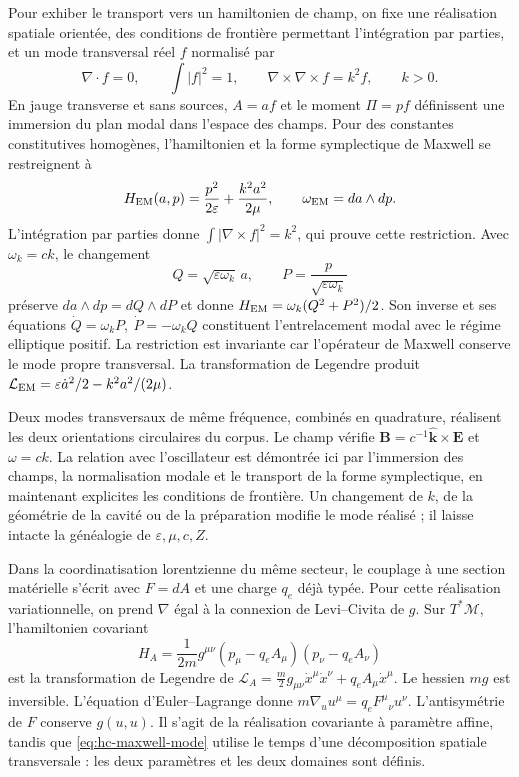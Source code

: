 Pour exhiber le transport vers un hamiltonien de champ, on fixe une
réalisation spatiale orientée, des conditions de frontière permettant
l’intégration par parties, et un mode transversal réel \(f\) normalisé par
\[
 \nabla\cdot f=0,\qquad \int|f|^2=1,\qquad
 \nabla\times\nabla\times f=k^2f,\qquad k>0.
\]
En jauge transverse et sans sources, \(A=af\) et le moment \(\Pi=pf\) définissent une immersion du plan modal dans l'espace des champs. Pour des constantes constitutives homogènes, l'hamiltonien et la forme symplectique de Maxwell se restreignent à
\begin{equation}
 H_{\rm EM}(a,p)=\frac{p^2}{2\varepsilon}
 +\frac{k^2a^2}{2\mu},\qquad \omega_{\rm EM}=da\wedge dp.
 \label{eq:hc-maxwell-mode}
\end{equation}
L’intégration par parties donne
\(\int|\nabla\times f|^2=k^2\), qui prouve cette restriction.
Avec \(\omega_k=ck\), le changement
\begin{equation}
 Q=\sqrt{\varepsilon\omega_k}\,a,
 \qquad P=\frac{p}{\sqrt{\varepsilon\omega_k}}
 \label{eq:hc-maxwell-symplectic}
\end{equation}
préserve \(da\wedge dp=dQ\wedge dP\) et donne
\(H_{\rm EM}=\omega_k(Q^2+P^2)/2\). Son inverse et ses équations
\(\dot Q=\omega_kP,\ \dot P=-\omega_kQ\)
constituent l’entrelacement modal avec le régime elliptique positif.
La restriction est invariante car l’opérateur de Maxwell conserve le
mode propre transversal. La transformation de Legendre produit
\(\mathcal L_{\rm EM}=\varepsilon\dot a^2/2-k^2a^2/(2\mu)\).

Deux modes transversaux de même fréquence, combinés en quadrature,
réalisent les deux orientations circulaires du corpus. Le champ vérifie
\(\mathbf B=c^{-1}\widehat{\mathbf k}\times\mathbf E\) et
\(\omega=ck\). La relation avec l’oscillateur est démontrée ici par
l’immersion des champs, la normalisation modale et le transport de la forme
symplectique, en maintenant explicites les conditions de frontière.
Un changement de \(k\), de la géométrie de la cavité ou de la préparation
modifie le mode réalisé ; il laisse intacte la généalogie de
\(\varepsilon,\mu,c,Z\).

Dans la coordinatisation lorentzienne du même secteur, le couplage à une section matérielle s'écrit avec \(F=dA\) et une charge \(q_e\) déjà typée. Pour cette réalisation variationnelle, on prend \(\nabla\) égal à la connexion de Levi--Civita de \(g\). Sur \(T^*\mathcal M\), l'hamiltonien covariant
\[
 H_A=\frac1{2m}g^{\mu\nu}(p_\mu-q_eA_\mu)(p_\nu-q_eA_\nu)
\]
est la transformation de Legendre de
\(\mathcal L_A=\frac m2g_{\mu\nu}\dot x^\mu\dot x^\nu
+q_eA_\mu\dot x^\mu\). Le hessien \(mg\) est inversible.
L’équation d’Euler--Lagrange donne
\(m\nabla_u u^\mu=q_eF^\mu{}_{\nu}u^\nu\).
L’antisymétrie de \(F\) conserve \(g(u,u)\). Il s’agit de la
réalisation covariante à paramètre affine, tandis que
\eqref{eq:hc-maxwell-mode} utilise le temps d’une décomposition
spatiale transversale : les deux paramètres et les deux domaines sont définis.

